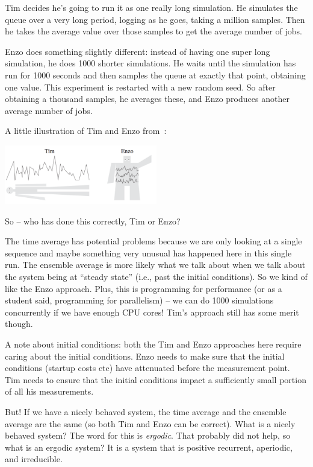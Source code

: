 \documentclass[a4paper]{report}
\begin{document}
Tim decides he's going to run it as one really long simulation. He simulates the queue over a very long period, logging as he goes, taking a million samples. Then he takes the average value over those samples to get the average number of jobs.

Enzo does something slightly different: instead of having one super long simulation, he does 1000 shorter simulations. He waits until the simulation has run for 1000 seconds and then samples the queue at exactly that point, obtaining one value. This experiment is restarted with a new random seed. So after obtaining a thousand samples, he averages these, and Enzo produces another average number of jobs.

A little illustration of Tim and Enzo from~\cite{pmd}:

\begin{center}
	\includegraphics[width=0.5\textwidth]{images/timenzo.png}
\end{center}

So -- who has done this correctly, Tim or Enzo?

The time average has potential problems because we are only looking at a single sequence and maybe something very unusual has happened here in this single run. The ensemble average is more likely what we talk about when we talk about the system being at ``steady state'' (i.e., past the initial conditions). So we kind of like the Enzo approach. Plus, this is programming for performance (or as a student said, programming for parallelism) -- we can do 1000 simulations concurrently if we have enough CPU cores! Tim's approach still has some merit though.

A note about initial conditions: both the Tim and Enzo approaches here require caring about the initial conditions. Enzo needs to make sure that the initial conditions (startup costs etc) have attenuated before the measurement point. Tim needs to ensure that the initial conditions impact a sufficiently small portion of all his measurements.

But! If we have a nicely behaved system, the time average and the ensemble average are the same (so both Tim and Enzo can be correct). What is a nicely behaved system? The word for this is \textit{ergodic}. That probably did not help, so what is an ergodic system? It is a system that is positive recurrent, aperiodic, and irreducible.
\end{document}
